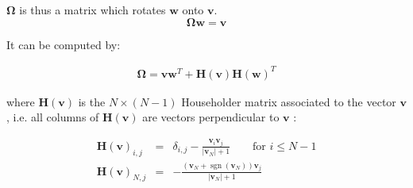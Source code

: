 \documentclass[a4paper,12pt]{article}
\newcommand{\sgn}{\mathop{\mathrm{sgn}}}
\begin{document}
$\mathbf \Omega$ is thus a matrix which rotates $\mathbf w$ onto $\mathbf v$. 
\begin{equation}
\mathbf \Omega \mathbf w = \mathbf v
\end{equation}

It can be computed by:

\begin{eqnarray}
\mathbf \Omega = \mathbf v \mathbf w^T  + \mathbf H({\mathbf v}) \mathbf H({\mathbf w})^T
\end{eqnarray}

where $\mathbf H(\mathbf v)$ is the $N \times (N-1)$ Householder matrix associated to the vector $\mathbf v$, i.e.
all columns of $\mathbf H({\mathbf v})$ are vectors perpendicular to $\mathbf v$ \citep{Hoteit02}:

\begin{eqnarray}
\mathbf H(\mathbf v)_{i,j} &=& \delta_{i,j} - \frac{\mathbf v_i \mathbf v_j}{|\mathbf v_N| + 1}   \qquad \mbox{for $i \le N-1$} \\
\mathbf H(\mathbf v)_{N,j} &=& - \frac{(\mathbf v_N + \sgn(\mathbf v_N)) \mathbf v_j }{|\mathbf v_N| + 1}
\end{eqnarray}







\end{document}
